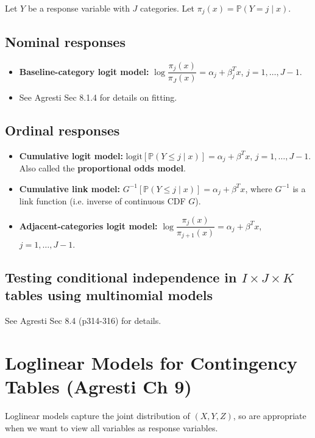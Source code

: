 \documentclass[twoside]{article}
\newcommand\bbP{\mathbb{P}}
\begin{document}
Let $Y$ be a response variable with $J$ categories. Let $\pi_j(x) = \bbP (Y = j \mid x)$.

\subsection{Nominal responses}
\begin{itemize}
\item \textbf{Baseline-category logit model:} $\log \dfrac{\pi_j(x)}{\pi_J(x)} = \alpha_j + \beta_j^T x$, $j = 1, \dots, J-1$.

\item See Agresti Sec 8.1.4 for details on fitting.
\end{itemize}

\subsection{Ordinal responses}
\begin{itemize}
\item \textbf{Cumulative logit model:} $\text{logit}[\bbP(Y \leq j \mid x)] = \alpha_j + \beta^T x$, $j = 1, \dots, J-1$. Also called the \textbf{proportional odds model}.

\item \textbf{Cumulative link model:} $G^{-1}[\bbP(Y \leq j \mid x)] = \alpha_j + \beta^T x$, where $G^{-1}$ is a link function (i.e. inverse of continuous CDF $G$).

\item \textbf{Adjacent-categories logit model:} $\log \dfrac{\pi_j(x)}{\pi_{j+1}(x)} = \alpha_j + \beta^T x$, $j = 1, \dots, J-1$.
\end{itemize}

\subsection{Testing conditional independence in $I \times J \times K$ tables using multinomial models}

See Agresti Sec 8.4 (p314-316) for details.

\section{Loglinear Models for Contingency Tables (Agresti Ch 9)}
Loglinear models capture the joint distribution of $(X,Y,Z)$, so are appropriate when we want to view all variables as response variables.
\end{document}
